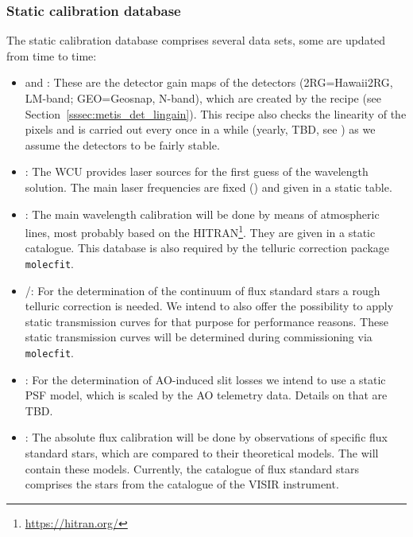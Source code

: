 \subsubsection{Static calibration database}\label{lss:static_calib}
The static calibration database comprises several data sets, some are updated from time to time:
\begin{itemize}
    \item \hyperref[dataitem:gain_map_lm]{} and \hyperref[dataitem:gain_map_n]{}: These are the detector gain maps of the detectors (2RG=Hawaii2RG, LM-band; GEO=Geosnap, N-band), which are created by the recipe \hyperref[sssec:metis_det_lingain]{} (see Section~\ref{sssec:metis_det_lingain}). This recipe also checks the linearity of the pixels and is carried out every once in a while (yearly, TBD, see \cite{METIS-calibration_plan}) as we assume the detectors to be fairly stable.
    \item \hyperref[dataitem:laser_tab]{}: The \ac{WCU} provides laser sources for the first guess of the wavelength solution. The main laser frequencies are fixed (\cite{METIS-calibration_plan}) and given in a static table.
    \item \hyperref[dataitem:atm_line_cat]{}: The main wavelength calibration will be done by means of atmospheric lines, most probably based on the \ac{HITRAN}\footnote{\url{https://hitran.org/}}. They are given in a static catalogue. This database is also required by the telluric correction package \texttt{molecfit}.
    \item \hyperref[dataitem:lm_synth_trans]{}/\hyperref[dataitem:n_synth_trans]{}: For the determination of the continuum of flux standard stars a rough telluric correction is needed. We intend to also offer the possibility to apply static transmission curves for that purpose for performance reasons. These static transmission curves will be determined during commissioning via \texttt{molecfit}.
    \item \hyperref[dataitem:ao_psf_model]{}: For the determination of \ac{AO}-induced slit losses we intend to use a static \ac{PSF} model, which is scaled by the \ac{AO} telemetry data. Details on that are TBD.
    \item \hyperref[dataitem:ref_flux_cat]{}: The absolute flux calibration will be done by observations of specific flux standard stars, which are compared to their theoretical models. The \hyperref[dataitem:ref_flux_cat]{} will contain these models. Currently, the catalogue of flux standard stars comprises the stars from the catalogue of the \ac{VISIR} instrument.

\end{itemize}
